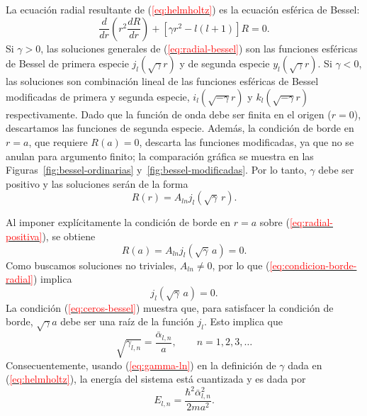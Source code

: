 \documentclass[11pt]{article}
\renewcommand{\eqref}[1]{(\hyperref[#1]{\textcolor{red}{\ref*{#1}}})}
\begin{document}
La ecuación radial resultante de \eqref{eq:helmholtz} es la ecuación esférica de Bessel:
\begin{equation}\label{eq:radial-bessel}
\frac{d}{dr}\left(r^2\frac{dR}{dr}\right) + [\gamma r^2 - l(l+1)]R = 0.
\end{equation}
Si $\gamma>0$, las soluciones generales de \eqref{eq:radial-bessel} son las funciones esféricas de Bessel de primera especie $j_l(\sqrt{\gamma}r)$ y de segunda especie $y_l(\sqrt{\gamma}r)$. Si $\gamma<0$, las soluciones son combinación lineal de las funciones esféricas de Bessel modificadas de primera y segunda especie, $i_l(\sqrt{-\gamma}r)$ y $k_l(\sqrt{-\gamma}r)$ respectivamente.
Dado que la función de onda debe ser finita en el origen ($r=0$), descartamos las funciones de segunda especie. Además, la condición de borde en $r=a$, que requiere $R(a)=0$, descarta las funciones modificadas, ya que no se anulan para argumento finito; la comparación gráfica se muestra en las Figuras~\ref{fig:bessel-ordinarias} y~\ref{fig:bessel-modificadas}. Por lo tanto, $\gamma$ debe ser positivo y las soluciones serán de la forma
\begin{equation}\label{eq:radial-positiva}
R(r) = A_{ln} j_l(\sqrt{\gamma}\,r).
\end{equation}

Al imponer explícitamente la condición de borde en $r=a$ sobre \eqref{eq:radial-positiva}, se obtiene
\begin{equation}\label{eq:condicion-borde-radial}
R(a)=A_{ln}j_l(\sqrt{\gamma}\,a)=0.
\end{equation}
Como buscamos soluciones no triviales, $A_{ln}\neq 0$, por lo que \eqref{eq:condicion-borde-radial} implica
\begin{equation}\label{eq:ceros-bessel}
j_l(\sqrt{\gamma}\,a)=0.
\end{equation}
La condición \eqref{eq:ceros-bessel} muestra que, para satisfacer la condición de borde, $\sqrt{\gamma}a$ debe ser una raíz de la función $j_l$. Esto implica que
\begin{equation}\label{eq:gamma-ln}
\sqrt{\gamma_{l,n}} = \frac{\bar\alpha_{l,n}}{a}, \qquad n = 1, 2, 3, \dots
\end{equation}
Consecuentemente, usando \eqref{eq:gamma-ln} en la definición de $\gamma$ dada en \eqref{eq:helmholtz}, la energía del sistema está cuantizada y es dada por
\begin{equation}\label{eq:energia-ln}
E_{l,n} = \frac{\hbar^2 \bar\alpha_{l,n}^2}{2ma^2}.
\end{equation}
\end{document}
